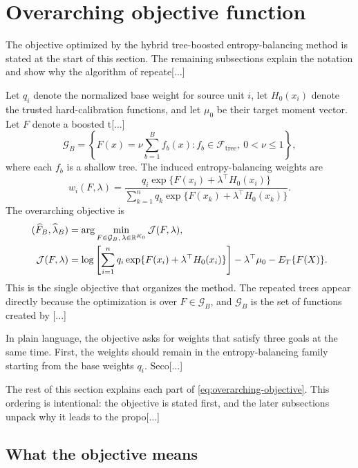 \documentclass[11pt]{article}
\begin{document}
\section{Overarching objective function}

The objective optimized by the hybrid tree-boosted entropy-balancing method is stated at the start of this section. The remaining subsections explain the notation and show why the algorithm of repeate[...] 

Let $q_i$ denote the normalized base weight for source unit $i$, let $H_0(x_i)$ denote the trusted hard-calibration functions, and let $\mu_0$ be their target moment vector. Let $F$ denote a boosted t[...]
\begin{equation*}
\mathcal{G}_B
=
\left\{
F(x)=\nu\sum_{b=1}^B f_b(x):
 f_b\in\mathcal{F}_{\mathrm{tree}},\ 0<\nu\leq 1
\right\},
\end{equation*}
where each $f_b$ is a shallow tree. The induced entropy-balancing weights are
\begin{equation}
w_i(F,\lambda)
=
\frac{
q_i\exp\{F(x_i)+\lambda^\top H_0(x_i)\}
}{
\sum_{k=1}^n q_k\exp\{F(x_k)+\lambda^\top H_0(x_k)\}
}.
\label{eq:ensemble-weight-form}
\end{equation}
The overarching objective is
\begin{align}
(\widehat F_B,\widehat\lambda_B)
&=
\arg\min_{F\in\mathcal{G}_B,\,\lambda\in\mathbb{R}^{K_0}}
\mathcal{J}(F,\lambda), \notag\\
\mathcal{J}(F,\lambda)
&=
\log\left[
\sum_{i=1}^n
q_i\exp\{F(x_i)+\lambda^\top H_0(x_i)\}
\right]
-
\lambda^\top\mu_0
-
E_T\{F(X)\}.
\label{eq:overarching-objective}
\end{align}
This is the single objective that organizes the method. The repeated trees appear directly because the optimization is over $F\in\mathcal{G}_B$, and $\mathcal{G}_B$ is the set of functions created by [...]

In plain language, the objective asks for weights that satisfy three goals at the same time. First, the weights should remain in the entropy-balancing family starting from the base weights $q_i$. Seco[...] 

The rest of this section explains each part of \eqref{eq:overarching-objective}. This ordering is intentional: the objective is stated first, and the later subsections unpack why it leads to the propo[...] 

\subsection{What the objective means}
\end{document}
